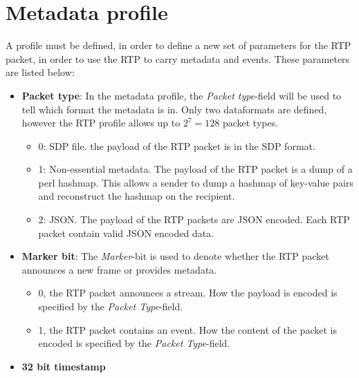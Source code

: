 \begin{table}[H]
\centering
{}
\caption{The table compares tcpdump and RTP tools.}
\label{sec:implementation:tcpreplaytcudmp}
\end{table}


\section{Metadata profile} \label{sec:implemented:metadataprofile} 
A profile must be defined, in order to define a new set of parameters for the RTP packet, in order to use the RTP to carry metadata and events. These parameters are listed below:

\begin{itemize}
	\item \textbf{Packet type}: In the metadata profile, the \textit{Packet type}-field will be used to tell which format the metadata is in. Only two  dataformats are defined, however the RTP profile allows up to $2^7=128$  packet types.
		\begin{itemize}
			\item 0: SDP file. the payload of the RTP packet is in the SDP format.
			\item 1: Non-essential metadata. The payload of the RTP packet is a dump of a perl hashmap. This allows a sender to dump a hashmap of key-value pairs and reconstruct the hashmap on the recipient.
			\item 2: JSON. The payload of the RTP packets are JSON encoded. Each RTP packet contain valid JSON encoded data.
		\end{itemize}
	\item \textbf{Marker bit}: The \textit{Marker}-bit is used to denote whether the RTP packet announces a new frame or provides metadata.
		\begin{itemize}
			\item 0, the RTP packet announces a stream. How the payload is encoded is specified by the \textit{Packet Type}-field.
			\item 1, the RTP packet contains an event. How the content of the packet is encoded is specified by the \textit{Packet Type}-field.
		\end{itemize}
	\item \textbf{32 bit timestamp}
\end{itemize}


